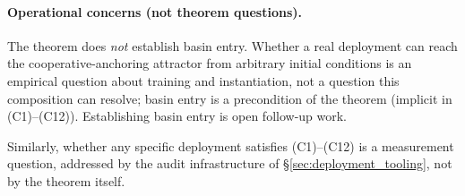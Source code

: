 \paragraph{Operational concerns (not theorem questions).}
The theorem does \emph{not} establish basin entry.  Whether a real
deployment can reach the cooperative-anchoring attractor from
arbitrary initial conditions is an empirical question about
training and instantiation, not a question this composition can
resolve; basin entry is a precondition of the theorem (implicit in
(C1)--(C12)).  Establishing basin entry is open follow-up work.

Similarly, whether any specific deployment satisfies (C1)--(C12) is
a measurement question, addressed by the audit infrastructure of
\S\ref{sec:deployment_tooling}, not by the theorem itself.
